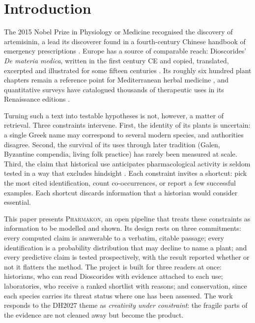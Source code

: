 \documentclass[11pt,a4paper]{article}
\newcommand{\pkm}{\textsc{Pharmakon}}
\begin{document}
\vspace{4pt}

\section{Introduction}

The 2015 Nobel Prize in Physiology or Medicine recognised the discovery of artemisinin, a lead its discoverer found in a fourth-century Chinese handbook of emergency prescriptions \citep{tu2011}. Europe has a source of comparable reach: Dioscorides’ \textit{De materia medica}, written in the first century CE and copied, translated, excerpted and illustrated for some fifteen centuries \citep{riddle1985,leonti2011}. Its roughly six hundred plant chapters remain a reference point for Mediterranean herbal medicine \citep{leonti2017}, and quantitative surveys have catalogued thousands of therapeutic uses in its Renaissance editions \citep{staub2016}.

Turning such a text into testable hypotheses is not, however, a matter of retrieval. Three constraints intervene. First, the identity of its plants is uncertain: a single Greek name may correspond to several modern species, and authorities disagree. Second, the survival of its uses through later tradition (Galen, Byzantine compendia, living folk practice) has rarely been measured at scale. Third, the claim that historical use anticipates pharmacological activity is seldom tested in a way that excludes hindsight \citep{buenz2004}. Each constraint invites a shortcut: pick the most cited identification, count co-occurrences, or report a few successful examples. Each shortcut discards information that a historian would consider essential.

This paper presents \pkm{}, an open pipeline that treats these constraints as information to be modelled and shown. Its design rests on three commitments: every computed claim is answerable to a verbatim, citable passage; every identification is a probability distribution that may decline to name a plant; and every predictive claim is tested prospectively, with the result reported whether or not it flatters the method. The project is built for three readers at once: historians, who can read Dioscorides with evidence attached to each use; laboratories, who receive a ranked shortlist with reasons; and conservation, since each species carries its threat status where one has been assessed. The work responds to the DH2027 theme as \emph{creativity under constraint}: the fragile parts of the evidence are not cleaned away but become the product.
\end{document}
